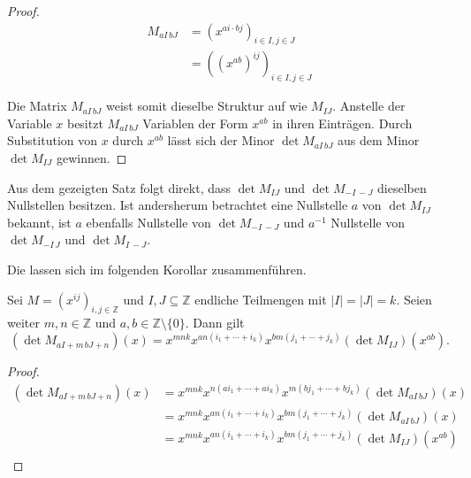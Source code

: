 \begin{proof}    
    \begin{align*}
        M_{aI\,bJ}   &= \left(x^{ai\cdot bj}\right)_{i\in I,j\in J} \\
                    &= \left((x^{ab})^{ij}\right)_{i\in I,j\in J}
    \end{align*}

    Die Matrix $M_{aI\,bJ}$ weist somit dieselbe Struktur auf wie $M_{IJ}$. Anstelle der Variable $x$ besitzt $M_{aI\,bJ}$ Variablen der Form $x^{ab}$ in ihren Einträgen. Durch Substitution von $x$ durch $x^{ab}$ lässt sich der Minor $\det M_{aI\,bJ}$ aus dem Minor $\det M_{IJ}$ gewinnen.
\end{proof}

Aus dem gezeigten Satz folgt direkt, dass $\det{} M_{IJ}$ und $\det{} M_{-I\,-J}$ dieselben Nullstellen besitzen. Ist andersherum betrachtet eine Nullstelle $a$ von $\det M_{IJ}$ bekannt, ist $a$ ebenfalls Nullstelle von $\det M_{-I\,-J}$ und $a^{-1}$ Nullstelle von $\det M_{-I\,J}$ und $\det M_{I\,-J}$.

Die  lassen sich im folgenden Korollar zusammenführen.

\begin{korollar}
    Sei $M = \left( x^{ij} \right)_{i,j \in \mathbb{Z}}$ und $I,J \subseteq \mathbb{Z}$ endliche Teilmengen mit ${|I|=|J|=k}$. Seien weiter $m,n \in \mathbb{Z}$ und $a,b \in \mathbb{Z}\setminus\{0\}$. Dann gilt
    \begin{equation*}
        \left( \det{} M_{aI+m\,bJ+n} \right) (x) = x^{mnk} x^{an(i_1+\cdots +i_k)} x^{bm(j_1 +\cdots + j_k)} \left( \det{} M_{IJ} \right) (x^{ab}).
    \end{equation*}
\end{korollar}

\begin{proof}
    \begin{align*}
        \left( \det{} M_{aI+m\,bJ+n} \right) (x)     &= x^{mnk} x^{n(ai_1+\cdots +ai_k)} x^{m(bj_1 +\cdots + bj_k)} \left( \det{} M_{aI\,bJ} \right) (x) \\
                                                    &= x^{mnk} x^{an(i_1+\cdots +i_k)} x^{bm(j_1 +\cdots + j_k)} \left( \det{} M_{aI\,bJ} \right) (x) \\
                                                    &= x^{mnk} x^{an(i_1+\cdots +i_k)} x^{bm(j_1 +\cdots + j_k)} \left( \det{} M_{IJ} \right) (x^{ab}) \\
    \end{align*}
\end{proof}

